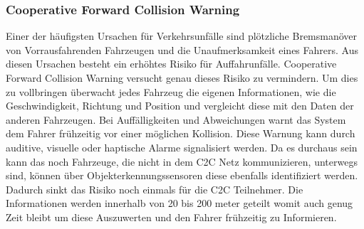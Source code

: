 \subsubsection{Cooperative Forward Collision Warning}
Einer der häufigsten Ursachen für Verkehrsunfälle sind plötzliche Bremsmanöver von Vorrausfahrenden Fahrzeugen und die Unaufmerksamkeit eines Fahrers. Aus diesen Ursachen besteht ein erhöhtes Risiko für Auffahrunfälle. Cooperative Forward Collision Warning versucht genau dieses Risiko zu vermindern. Um dies zu vollbringen überwacht jedes Fahrzeug die eigenen Informationen, wie die Geschwindigkeit, Richtung und Position und vergleicht diese mit den Daten der anderen Fahrzeugen. Bei Auffälligkeiten und Abweichungen warnt das System dem Fahrer frühzeitig vor einer möglichen Kollision. Diese Warnung kann durch auditive, visuelle oder haptische Alarme signalisiert werden. Da es durchaus sein kann das noch Fahrzeuge, die nicht in dem C2C Netz kommunizieren, unterwegs sind, können über Objekterkennungssensoren diese ebenfalls identifiziert werden. Dadurch sinkt das Risiko noch einmals für die C2C Teilnehmer. Die Informationen werden innerhalb von 20 bis 200 meter geteilt womit auch genug Zeit bleibt um diese Auszuwerten und den Fahrer frühzeitig zu Informieren. 

